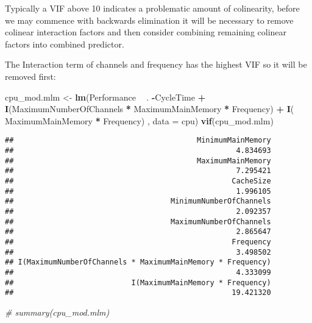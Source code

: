 \documentclass[12pt]{article}
\newenvironment{Shaded}{\begin{snugshade}}{\end{snugshade}}
\newcommand{\CommentTok}[1]{\textcolor[rgb]{0.56,0.35,0.01}{\textit{#1}}}
\newcommand{\DataTypeTok}[1]{\textcolor[rgb]{0.13,0.29,0.53}{#1}}
\newcommand{\KeywordTok}[1]{\textcolor[rgb]{0.13,0.29,0.53}{\textbf{#1}}}
\newcommand{\NormalTok}[1]{#1}
\newcommand{\OperatorTok}[1]{\textcolor[rgb]{0.81,0.36,0.00}{\textbf{#1}}}
\newcommand{\StringTok}[1]{\textcolor[rgb]{0.31,0.60,0.02}{#1}}
\begin{document}
Typically a VIF above 10 indicates a problematic amount of colinearity,
before we may commence with backwards elimination it will be necessary
to remove colinear interaction factors and then consider combining
remaining colinear factors into combined predictor.

The Interaction term of channels and frequency has the highest VIF so it
will be removed first:

\begin{Shaded}
\begin{Highlighting}[]
\NormalTok{cpu_mod.mlm <-}\StringTok{ }\KeywordTok{lm}\NormalTok{(Performance }\OperatorTok{~}\StringTok{ }\NormalTok{. }\OperatorTok{-}\NormalTok{CycleTime }\OperatorTok{+}\StringTok{ }\KeywordTok{I}\NormalTok{(MaximumNumberOfChannels }\OperatorTok{*}\StringTok{ }\NormalTok{MaximumMainMemory }\OperatorTok{*}\StringTok{ }\NormalTok{Frequency) }\OperatorTok{+}\StringTok{ }\KeywordTok{I}\NormalTok{( MaximumMainMemory }\OperatorTok{*}\StringTok{ }\NormalTok{Frequency)   , }\DataTypeTok{data =}\NormalTok{ cpu) }
\KeywordTok{vif}\NormalTok{(cpu_mod.mlm)}
\end{Highlighting}
\end{Shaded}

\begin{verbatim}
##                                          MinimumMainMemory 
##                                                   4.834693 
##                                          MaximumMainMemory 
##                                                   7.295421 
##                                                  CacheSize 
##                                                   1.996105 
##                                    MinimumNumberOfChannels 
##                                                   2.092357 
##                                    MaximumNumberOfChannels 
##                                                   2.865647 
##                                                  Frequency 
##                                                   3.498502 
## I(MaximumNumberOfChannels * MaximumMainMemory * Frequency) 
##                                                   4.333099 
##                           I(MaximumMainMemory * Frequency) 
##                                                  19.421320
\end{verbatim}

\begin{Shaded}
\begin{Highlighting}[]
\CommentTok{# summary(cpu_mod.mlm)}
\end{Highlighting}
\end{Shaded}
\end{document}
